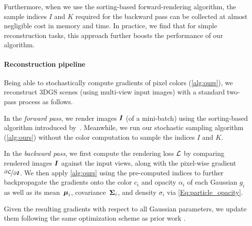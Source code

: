 	Furthermore, when we use the sorting-based forward-rendering algorithm, the sample indices $I$ and $K$ required for the backward pass can be collected at almost negligible cost in memory and time. In practice, we find that for simple reconstruction tasks, this approach further boosts the performance of our algorithm.


\paragraph{Reconstruction pipeline}
	Being able to stochastically compute gradients of pixel colors (\autoref{alg:ours}), we reconstruct 3DGS scenes (using multi-view input images) with a standard two-pass process as follows.

	In the \emph{forward pass}, we render images $\boldsymbol{I}$ (of a mini-batch) using the sorting-based algorithm introduced by~\citet{loccoz20243dgrt}. Meanwhile, we run our stochastic sampling algorithm (\autoref{alg:ours}) without the color computation to sample the indices $I$ and $K$.

In the \emph{backward pass}, we first compute the rendering loss $\mathcal{L}$ by comparing rendered images $\boldsymbol{I}$ against the input views, along with the pixel-wise gradient $\nicefrac{\partial\mathcal{L}}{\partial\boldsymbol{I}}$.
	We then apply \autoref{alg:ours} using the pre-computed indices to further backpropagate the gradients onto the color $c_i$ and opacity $\alpha_i$ of each Gaussian $g_i$ as well as its mean~$\boldsymbol{\mu}_i$, covariance~$\boldsymbol{\Sigma}_i$, and density $\sigma_i$ via \autoref{Eq:particle_opacity}.

Given the resulting gradients with respect to all Gaussian parameters, we update them following the same optimization scheme as prior work \cite{kerbl20233d, loccoz20243dgrt}.


